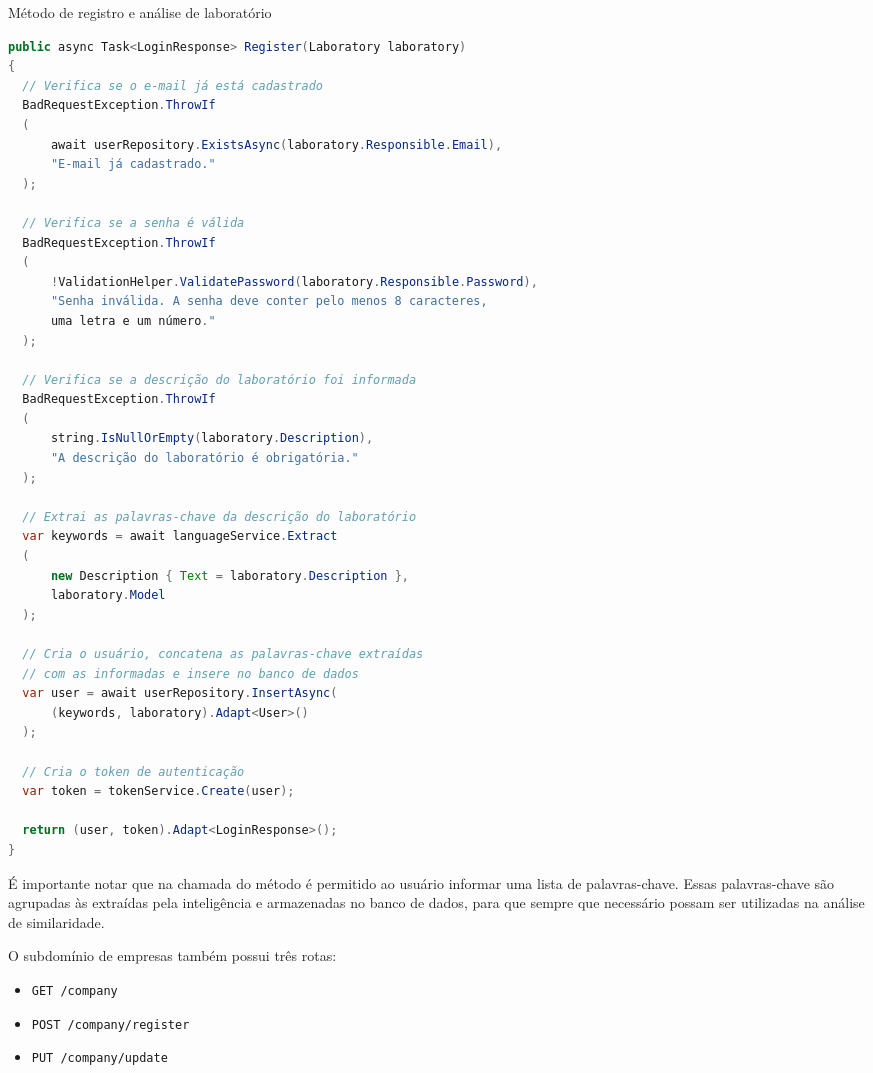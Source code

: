 \begin{sourcecode}[H]
  \caption{\label{codigo:analyze-lab}Método de registro e análise de laboratório}
  \begin{lstlisting}[frame=single, language=Java]
public async Task<LoginResponse> Register(Laboratory laboratory)
{
  // Verifica se o e-mail já está cadastrado
  BadRequestException.ThrowIf 
  (
      await userRepository.ExistsAsync(laboratory.Responsible.Email), 
      "E-mail já cadastrado."
  );

  // Verifica se a senha é válida
  BadRequestException.ThrowIf
  (
      !ValidationHelper.ValidatePassword(laboratory.Responsible.Password), 
      "Senha inválida. A senha deve conter pelo menos 8 caracteres, 
      uma letra e um número."
  );

  // Verifica se a descrição do laboratório foi informada
  BadRequestException.ThrowIf
  (
      string.IsNullOrEmpty(laboratory.Description), 
      "A descrição do laboratório é obrigatória."
  );

  // Extrai as palavras-chave da descrição do laboratório
  var keywords = await languageService.Extract
  (
      new Description { Text = laboratory.Description },
      laboratory.Model
  );

  // Cria o usuário, concatena as palavras-chave extraídas 
  // com as informadas e insere no banco de dados
  var user = await userRepository.InsertAsync(
      (keywords, laboratory).Adapt<User>()
  );

  // Cria o token de autenticação
  var token = tokenService.Create(user);

  return (user, token).Adapt<LoginResponse>();
}
\end{lstlisting}
  \fonte{}
\end{sourcecode}

É importante notar que na chamada do método é permitido ao usuário informar uma lista de palavras-chave. Essas palavras-chave são agrupadas às extraídas pela inteligência e armazenadas no banco de dados, para que sempre que necessário possam ser utilizadas na análise de similaridade.

O subdomínio de empresas também possui três rotas:

\begin{itemize}
  \item \texttt{GET /company}
  \item \texttt{POST /company/register}
  \item \texttt{PUT /company/update}
\end{itemize}

